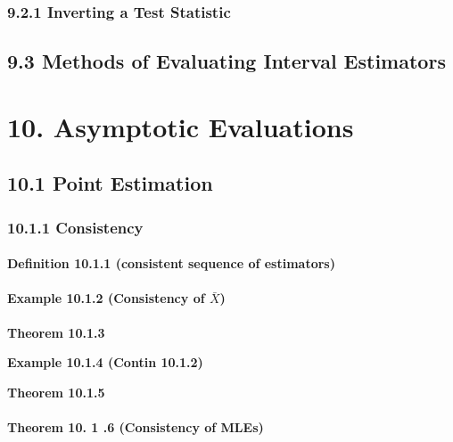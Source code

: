 \documentclass[6pt,twocolumn,Portrait]{article}
\let\oldparagraph\paragraph
\renewcommand{\paragraph}[1]{\oldparagraph{#1}\mbox{}}
\begin{document}
\hypertarget{inverting-a-test-statistic}{%
\subsubsection{9.2.1 Inverting a Test
Statistic}\label{inverting-a-test-statistic}}

\hypertarget{methods-of-evaluating-interval-estimators}{%
\subsection{9.3 Methods of Evaluating Interval
Estimators}\label{methods-of-evaluating-interval-estimators}}

\hypertarget{asymptotic-evaluations}{%
\section{10. Asymptotic Evaluations}\label{asymptotic-evaluations}}

\hypertarget{point-estimation-1}{%
\subsection{10.1 Point Estimation}\label{point-estimation-1}}

\hypertarget{consistency}{%
\subsubsection{10.1.1 Consistency}\label{consistency}}

\hypertarget{consi-Seq-E}{%
\paragraph{\texorpdfstring{\textbf{Definition 10.1.1 (consistent
sequence of
estimators)}}{Definition 10.1.1 (consistent sequence of estimators)}}\label{consi-Seq-E}}

\hypertarget{consi-M}{%
\paragraph{\texorpdfstring{\textbf{Example 10.1.2 (Consistency of
\(\bar X\))}}{Example 10.1.2 (Consistency of \textbackslash{}bar X)}}\label{consi-M}}

\textbf{Theorem 10.1.3}

\textbf{Example 10.1.4 (Contin 10.1.2)}

\textbf{Theorem 10.1.5}

\hypertarget{consi-MLE}{%
\paragraph{\texorpdfstring{\textbf{Theorem 10. 1 .6 (Consistency of
MLEs)}}{Theorem 10. 1 .6 (Consistency of MLEs)}}\label{consi-MLE}}
\end{document}
